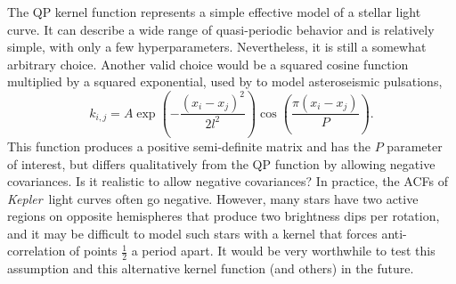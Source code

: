 \documentclass[useAMS, usenatbib, preprint, 12pt]{aastex}
\newcommand{\Kepler}{{\it Kepler}}
\begin{document}
The QP kernel function represents a simple effective model of a stellar
light curve.
It can describe a wide range of quasi-periodic behavior and is
relatively simple, with only a few hyperparameters.
Nevertheless, it is still a somewhat arbitrary choice.
Another valid choice would be a squared cosine function multiplied by a
squared exponential, used by \citet{Brewer2009} to model asteroseismic
pulsations,
\begin{equation}
k_{i,j} = A \exp \left(-\frac{(x_i - x_j)^2}{2l^2}\right)
\cos\left(\frac{\pi(x_i - x_j)}{P}\right).
\end{equation}
\label{eq:cos_kernel}
This function produces a positive semi-definite matrix and has the $P$
parameter of interest, but differs qualitatively from the QP function
by allowing negative covariances.
Is it realistic to allow negative covariances?
In practice, the ACFs of \Kepler\ light curves often go negative.
However, many stars have two active regions on opposite hemispheres that
produce two brightness dips per rotation, and it
may be difficult to model such stars with a kernel that forces
anti-correlation of points $\frac{1}{2}$ a period apart.
It would be very worthwhile to test this assumption and this alternative
kernel function (and others) in the future.
\end{document}
